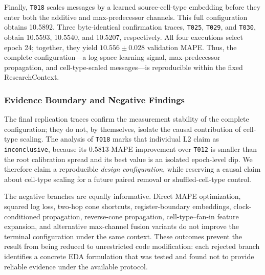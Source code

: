 Finally, \texttt{T018} scales messages by a learned source-cell-type embedding
before they enter both the additive and max-predecessor channels. This full
configuration obtains 10.5892. Three byte-identical confirmation traces,
\texttt{T025}, \texttt{T029}, and \texttt{T030}, obtain 10.5593, 10.5540, and
10.5207, respectively. All four executions select epoch 24; together, they
yield $10.556 \pm 0.028$ validation MAPE. Thus, the complete configuration---a
log-space learning signal, max-predecessor propagation, and cell-type-scaled
messages---is reproducible within the fixed ResearchContext.

\subsubsection{Evidence Boundary and Negative Findings}

The final replication traces confirm the measurement stability of the complete
configuration; they do not, by themselves, isolate the causal contribution of
cell-type scaling. The analysis of \texttt{T018} marks that individual L2
claim as \texttt{inconclusive}, because its 0.5813-MAPE improvement over
\texttt{T012} is smaller than the root calibration spread and its best value is
an isolated epoch-level dip. We therefore claim a reproducible \emph{design
configuration}, while reserving a causal claim about cell-type scaling for a
future paired removal or shuffled-cell-type control.

The negative branches are equally informative. Direct MAPE optimization,
squared log loss, two-hop cone shortcuts, register-boundary embeddings,
clock-conditioned propagation, reverse-cone propagation, cell-type--fan-in
feature expansion, and alternative max-channel fusion variants do not improve
the terminal configuration under the same context. These outcomes prevent the
result from being reduced to unrestricted code modification: each rejected
branch identifies a concrete EDA formulation that was tested and found not to
provide reliable evidence under the available protocol.

